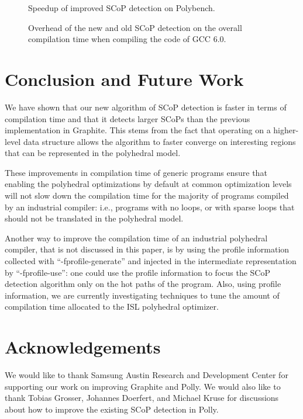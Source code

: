 \documentclass{sig-alternate}
\begin{document}
\begin {figure}
  \begin{center}
    \resizebox{\linewidth}{!}{}
  \end{center}
  \caption{Speedup of improved SCoP detection on Polybench.}
  \label{fig:polybench-speedup}
\end {figure}

\begin {figure}
  \begin{center}
    \resizebox{\linewidth}{!}{}
  \end{center}
  \caption{Overhead of the new and old SCoP detection on the overall compilation
    time when compiling the code of GCC 6.0.}
  \label{fig:gcc-speedup}
\end {figure}

\newpage
\section{Conclusion and Future Work}
We have shown that our new algorithm of SCoP detection is faster in terms of
compilation time and that it detects larger SCoPs than the previous
implementation in Graphite.  This stems from the fact that operating on a
higher-level data structure allows the algorithm to faster converge on
interesting regions that can be represented in the polyhedral model.

These improvements in compilation time of generic programs ensure that enabling
the polyhedral optimizations by default at common optimization levels will not
slow down the compilation time for the majority of programs compiled by an
industrial compiler: i.e., programs with no loops, or with sparse loops that
should not be translated in the polyhedral model.

Another way to improve the compilation time of an industrial polyhedral
compiler, that is not discussed in this paper, is by using the profile
information collected with ``-fprofile-generate'' and injected in the
intermediate representation by ``-fprofile-use'': one could use the profile
information to focus the SCoP detection algorithm only on the hot paths of the
program.  Also, using profile information, we are currently investigating
techniques to tune the amount of compilation time allocated to the ISL
polyhedral optimizer.

\section{Acknowledgements}
We would like to thank Samsung Austin Research and Development Center for
supporting our work on improving Graphite and Polly.  We would also like to
thank Tobias Grosser, Johannes Doerfert, and Michael Kruse for discussions about
how to improve the existing SCoP detection in Polly.


{\small

}
\end{document}
